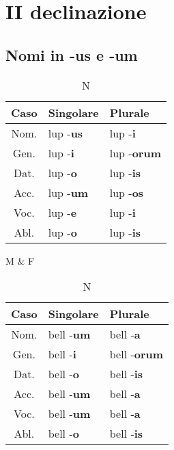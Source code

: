 \section{II declinazione}
\subsection{Nomi in -us e -um}
\begin{table}[h!]
    \begin{minipage}{.4\linewidth}
        \centering
        \begin{tabular}{|c|l|l|}
            \hline
            \textbf{Caso} & \textbf{Singolare} & \textbf{Plurale} \\
            \hline
            Nom. & lup -\textbf{us} & lup -\textbf{i} \\
            \hline
            Gen. & lup -\textbf{i}  & lup -\textbf{orum} \\
            \hline
            Dat. & lup -\textbf{o}  & lup -\textbf{is} \\
            \hline
            Acc. & lup -\textbf{um} & lup -\textbf{os} \\
            \hline
            Voc. & lup -\textbf{e}  & lup -\textbf{i} \\
            \hline
            Abl. & lup -\textbf{o}  & lup -\textbf{is} \\
            \hline
        \end{tabular}
        \caption{M \& F}
    \end{minipage}
    \hfill
    \begin{minipage}{.4\linewidth}
        \centering
        \begin{tabular}{|c|l|l|}
            \hline
            \textbf{Caso} & \textbf{Singolare} & \textbf{Plurale} \\
            \hline
            Nom. & bell -\textbf{um} & bell -\textbf{a} \\
            \hline
            Gen. & bell -\textbf{i}  & bell -\textbf{orum} \\
            \hline
            Dat. & bell -\textbf{o}  & bell -\textbf{is} \\
            \hline
            Acc. & bell -\textbf{um} & bell -\textbf{a} \\
            \hline
            Voc. & bell -\textbf{um}  & bell -\textbf{a} \\
            \hline
            Abl. & bell -\textbf{o}  & bell -\textbf{is} \\
            \hline
        \end{tabular}
        \caption{N}
    \end{minipage}
\end{table}

